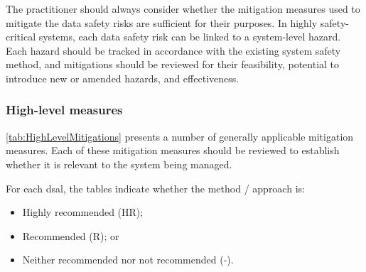 The practitioner should always consider whether the \gls{mitigation} measures used to mitigate the data safety risks are sufficient for their purposes. In highly safety-critical systems, each data safety risk can be linked to a system-level hazard. Each hazard  should be tracked in accordance with the existing system safety method, and \glspl{mitigation}  should be reviewed for their feasibility, potential to introduce new or amended hazards, and effectiveness.

\subsubsection{High-level  measures}
\autoref{tab:HighLevelMitigations} presents a number of generally applicable \gls{mitigation} measures.
Each of these \gls{mitigation} measures should be reviewed to establish whether it is relevant to the system \cbstart being managed\cbend.

For each \gls{dsal}, the tables indicate whether the method / approach is:
\begin{itemize}
  \item Highly recommended (HR);
  \item Recommended (R); or
  \item Neither recommended nor not recommended (-).
\end{itemize}

